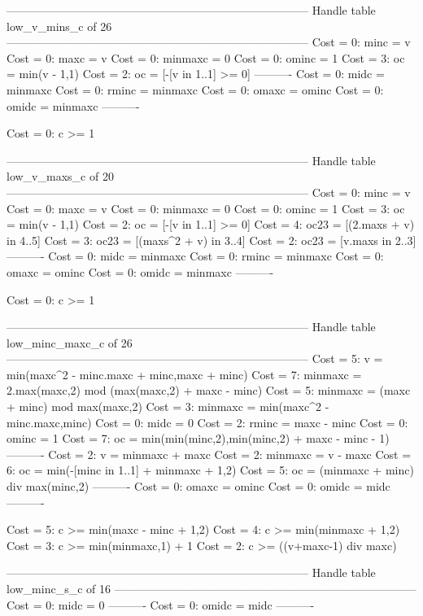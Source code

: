 --------------------------------------------------------------------------------
Handle table low_v_mins_c of 26
--------------------------------------------------------------------------------
Cost =  0:  minc    = v
Cost =  0:  maxc    = v
Cost =  0:  minmaxc = 0
Cost =  0:  ominc   = 1
Cost =  3:  oc      = min(v - 1,1)
Cost =  2:  oc      = [-[v in 1..1] >= 0]
----------
Cost =  0:  midc    = minmaxc
Cost =  0:  rminc   = minmaxc
Cost =  0:  omaxc   = ominc
Cost =  0:  omidc   = minmaxc
----------

Cost =  0:  c >= 1

--------------------------------------------------------------------------------
Handle table low_v_maxs_c of 20
--------------------------------------------------------------------------------
Cost =  0:  minc    = v
Cost =  0:  maxc    = v
Cost =  0:  minmaxc = 0
Cost =  0:  ominc   = 1
Cost =  3:  oc      = min(v - 1,1)
Cost =  2:  oc      = [-[v in 1..1] >= 0]
Cost =  4:  oc23    = [(2.maxs + v) in 4..5]
Cost =  3:  oc23    = [(maxs^2 + v) in 3..4]
Cost =  2:  oc23    = [v.maxs in 2..3]
----------
Cost =  0:  midc    = minmaxc
Cost =  0:  rminc   = minmaxc
Cost =  0:  omaxc   = ominc
Cost =  0:  omidc   = minmaxc
----------

Cost =  0:  c >= 1

--------------------------------------------------------------------------------
Handle table low_minc_maxc_c of 26
--------------------------------------------------------------------------------
Cost =  5:  v       = min(maxc^2 - minc.maxc + minc,maxc + minc)
Cost =  7:  minmaxc = 2.max(maxc,2) mod (max(maxc,2) + maxc - minc)
Cost =  5:  minmaxc = (maxc + minc) mod max(maxc,2)
Cost =  3:  minmaxc = min(maxc^2 - minc.maxc,minc)
Cost =  0:  midc    = 0
Cost =  2:  rminc   = maxc - minc
Cost =  0:  ominc   = 1
Cost =  7:  oc      = min(min(minc,2),min(minc,2) + maxc - minc - 1)
----------
Cost =  2:  v       = minmaxc + maxc
Cost =  2:  minmaxc = v - maxc
Cost =  6:  oc      = min(-[minc in 1..1] + minmaxc + 1,2)
Cost =  5:  oc      = (minmaxc + minc) div max(minc,2)
----------
Cost =  0:  omaxc   = ominc
Cost =  0:  omidc   = midc
----------

Cost =  5:  c >= min(maxc - minc + 1,2)
Cost =  4:  c >= min(minmaxc + 1,2)
Cost =  3:  c >= min(minmaxc,1) + 1
Cost =  2:  c >= ((v+maxc-1) div maxc)

--------------------------------------------------------------------------------
Handle table low_minc_s_c of 16
--------------------------------------------------------------------------------
Cost =  0:  midc  = 0
----------
Cost =  0:  omidc = midc
----------

